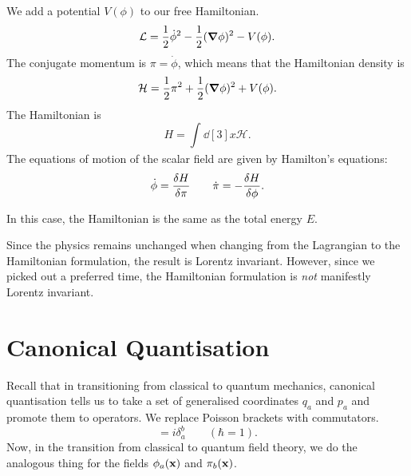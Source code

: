 \begin{example}
  We add a potential $V(\phi)$ to our free Hamiltonian.
  \begin{equation}
    \mathcal{L} =  \frac{1}{2}\dot \phi^2 - \frac{1}{2}(\grad \phi)^2 - V(\phi).
  \end{equation}
  The conjugate momentum is $\pi = \dot \phi$, which means that the Hamiltonian density is
  \begin{equation}
    \mathcal{H} = \frac{1}{2}\pi^2 + \frac{1}{2}(\grad \phi)^2 + V(\phi).
  \end{equation}
  The Hamiltonian is
  \begin{equation}
    H = \int_{}^{} \dd[3]{x} \mathcal{H}.
  \end{equation}
  The equations of motion of the scalar field are given by Hamilton's equations:
  \begin{equation}
    \dot \phi = \fdv{H}{\pi} \qquad \dot \pi = -\fdv{H}{\phi}.
  \end{equation}

  \begin{leftbar}
    \begin{remark}
      In this case, the Hamiltonian is the same as the total energy $E$.
    \end{remark}
  \end{leftbar}
\end{example}

Since the physics remains unchanged when changing from the Lagrangian to the Hamiltonian formulation, the result is Lorentz invariant. However, since we picked out a preferred time, the Hamiltonian formulation is \emph{not} manifestly Lorentz invariant.

\section{Canonical Quantisation}%
\label{sec:canonical_quantisation}

Recall that in transitioning from classical to quantum mechanics, canonical quantisation tells us to take a set of generalised coordinates $q_a$ and $p_a$ and promote them to operators. We replace Poisson brackets with commutators.
\begin{equation}
  [q_a, p^b] = i \delta_a^b \qquad (\hbar = 1).
\end{equation}
Now, in the transition from classical to quantum field theory, we do the analogous thing for the fields $\phi_a(\vb{x})$ and $\pi_b(\vb{x})$.


